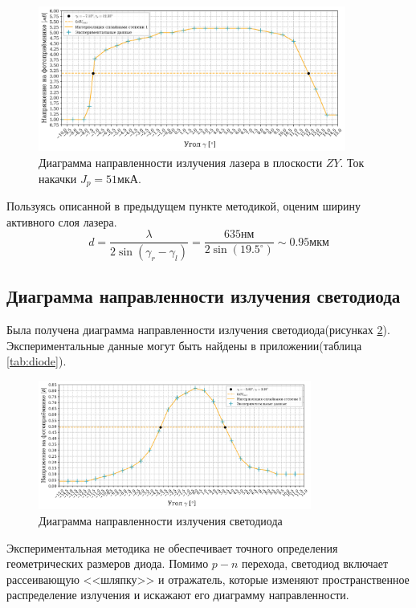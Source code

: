 \documentclass[a4paper, 12pt]{extarticle}
\begin{document}
\begin{figure}[htbp]
    \centering
    \includegraphics[width = 0.9\textwidth]{pics/lazer_horizontal_51.png}
    \caption{Диаграмма направленности излучения лазера в плоскости $ZY$. Ток накачки $J_p = 51\text{мкА}$.}
    \label{fig:ZY_51}
\end{figure}

Пользуясь описанной в предыдущем пункте методикой, оценим ширину активного слоя лазера.
$$
d = \frac{\lambda}{2 \sin(\gamma_r - \gamma_l)} = \frac{635 \text{нм}}{2 \sin(19.5^{\circ})} \sim 0.95 \text{мкм}
$$

\subsection*{\textcolor{sub_header}{Диаграмма направленности излучения светодиода}}

Была получена диаграмма направленности излучения светодиода(рисунках \ref{fig:diode}). Экспериментальные данные могут быть найдены в приложении(таблица \ref{tab:diode}).

\begin{figure}[htbp]
    \centering
    \includegraphics[width = 0.8\textwidth]{pics/diode.png}
    \caption{Диаграмма направленности излучения светодиода}
    \label{fig:diode}
\end{figure}

Экспериментальная методика не обеспечивает точного определения геометрических размеров диода. Помимо $p-n$ перехода, светодиод включает рассеивающую <<шляпку>> и отражатель, которые изменяют пространственное распределение излучения и искажают его диаграмму направленности.
\end{document}

